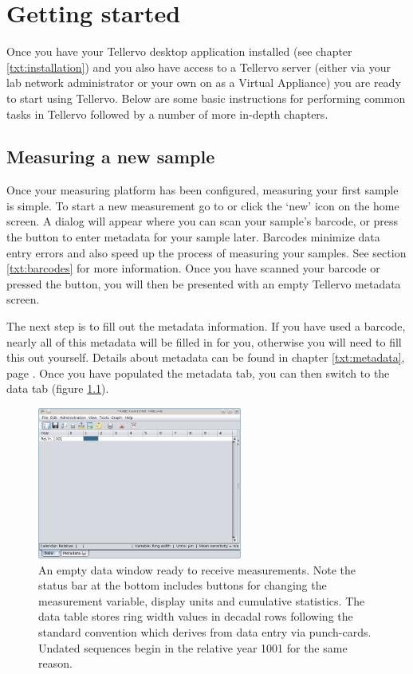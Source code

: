 
\chapter{Getting started}
\label{txt:gettingstarted}

Once you have your Tellervo desktop application installed (see chapter \ref{txt:installation}) and you also have access to a Tellervo server (either via your lab network administrator or your own on as a Virtual Appliance) you are ready to start using Tellervo.  Below are some basic instructions for performing common tasks in Tellervo followed by a number of more in-depth chapters.

\section{Measuring a new sample}
Once your measuring platform has been configured, measuring your first sample is simple.  To start a new measurement go to  or click the `new' icon on the home screen. A dialog will appear where you can scan your sample's barcode, or press the button to enter metadata for your sample later. Barcodes minimize data entry errors and also speed up the process of measuring your samples. See section \ref{txt:barcodes} for more information. Once you have scanned your barcode or pressed the button, you will then be presented with an empty Tellervo metadata screen.

The next step is to fill out the metadata information. If you have used a barcode, nearly all of this metadata will be filled in for you, otherwise you will need to fill this out yourself. Details about metadata can be found in chapter \ref{txt:metadata}, page \pageref{txt:metadata}.  Once you have populated the metadata tab, you can then switch to the data tab (figure \ref{fig:datascreen}).  

\begin{figure}[hbtp]
  \centering
    \includegraphics[width=0.6\textwidth]{Images/datascreen.png}
    \caption{An empty data window ready to receive measurements.  Note the status bar at the bottom includes buttons for changing the measurement variable, display units and cumulative statistics.  The data table stores ring width values in decadal rows following the standard convention which derives from data entry via punch-cards.  Undated sequences begin in the relative year 1001 for the same reason.}
    \label{fig:datascreen}
\end{figure}

